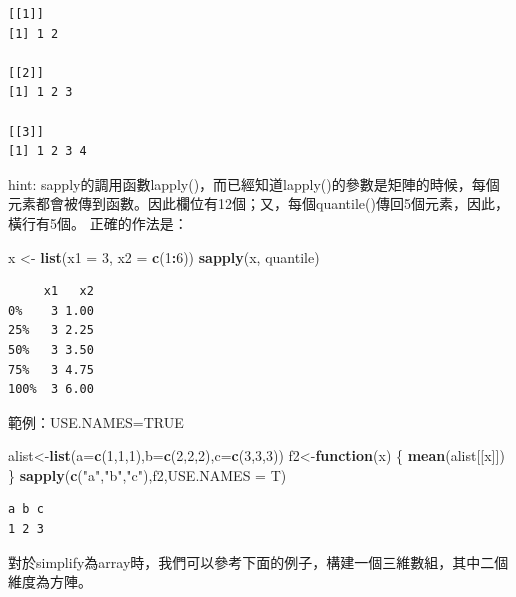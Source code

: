 \documentclass[]{book}
\newenvironment{Shaded}{\begin{snugshade}}{\end{snugshade}}
\newcommand{\ControlFlowTok}[1]{\textcolor[rgb]{0.13,0.29,0.53}{\textbf{#1}}}
\newcommand{\DataTypeTok}[1]{\textcolor[rgb]{0.13,0.29,0.53}{#1}}
\newcommand{\DecValTok}[1]{\textcolor[rgb]{0.00,0.00,0.81}{#1}}
\newcommand{\KeywordTok}[1]{\textcolor[rgb]{0.13,0.29,0.53}{\textbf{#1}}}
\newcommand{\NormalTok}[1]{#1}
\newcommand{\OperatorTok}[1]{\textcolor[rgb]{0.81,0.36,0.00}{\textbf{#1}}}
\newcommand{\StringTok}[1]{\textcolor[rgb]{0.31,0.60,0.02}{#1}}
\theoremstyle{definition}
\theoremstyle{definition}
\theoremstyle{definition}
\theoremstyle{remark}
\begin{document}
\begin{verbatim}
[[1]]
[1] 1 2

[[2]]
[1] 1 2 3

[[3]]
[1] 1 2 3 4
\end{verbatim}

hint:
sapply的調用函數lapply()，而已經知道lapply()的參數是矩陣的時候，每個元素都會被傳到函數。因此欄位有12個；又，每個quantile()傳回5個元素，因此，橫行有5個。
正確的作法是：

\begin{Shaded}
\begin{Highlighting}[]
\NormalTok{x <-}\StringTok{ }\KeywordTok{list}\NormalTok{(}\DataTypeTok{x1 =} \DecValTok{3}\NormalTok{, }\DataTypeTok{x2 =} \KeywordTok{c}\NormalTok{(}\DecValTok{1}\OperatorTok{:}\DecValTok{6}\NormalTok{))}
\KeywordTok{sapply}\NormalTok{(x, quantile)   }
\end{Highlighting}
\end{Shaded}

\begin{verbatim}
     x1   x2
0%    3 1.00
25%   3 2.25
50%   3 3.50
75%   3 4.75
100%  3 6.00
\end{verbatim}

範例：USE.NAMES=TRUE

\begin{Shaded}
\begin{Highlighting}[]
\NormalTok{alist<-}\KeywordTok{list}\NormalTok{(}\DataTypeTok{a=}\KeywordTok{c}\NormalTok{(}\DecValTok{1}\NormalTok{,}\DecValTok{1}\NormalTok{,}\DecValTok{1}\NormalTok{),}\DataTypeTok{b=}\KeywordTok{c}\NormalTok{(}\DecValTok{2}\NormalTok{,}\DecValTok{2}\NormalTok{,}\DecValTok{2}\NormalTok{),}\DataTypeTok{c=}\KeywordTok{c}\NormalTok{(}\DecValTok{3}\NormalTok{,}\DecValTok{3}\NormalTok{,}\DecValTok{3}\NormalTok{))}
\NormalTok{f2<-}\ControlFlowTok{function}\NormalTok{(x)}
\NormalTok{\{}
  \KeywordTok{mean}\NormalTok{(alist[[x]])}
\NormalTok{\}}
\KeywordTok{sapply}\NormalTok{(}\KeywordTok{c}\NormalTok{(}\StringTok{"a"}\NormalTok{,}\StringTok{"b"}\NormalTok{,}\StringTok{"c"}\NormalTok{),f2,}\DataTypeTok{USE.NAMES =}\NormalTok{ T)}
\end{Highlighting}
\end{Shaded}

\begin{verbatim}
a b c 
1 2 3 
\end{verbatim}

對於simplify為array時，我們可以參考下面的例子，構建一個三維數組，其中二個維度為方陣。
\end{document}
